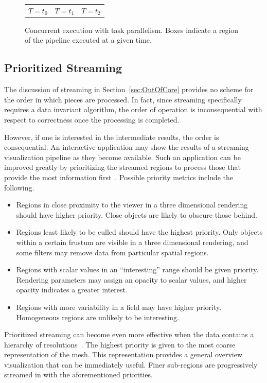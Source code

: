\documentclass[journal,twocolumn,10pt,letterpaper,twoside]{IEEEtran}
\newcommand*{\lcite}[1]{~\cite{#1}}
\newenvironment{packeditemize}{
  \begin{itemize}
    \setlength{\topsep}{0pt}
    \setlength{\itemsep}{0pt}
    \setlength{\parskip}{0pt}
    \setlength{\parsep}{0pt}
    \setlength{\partopsep}{0pt}
}{
  \end{itemize}
}
\begin{document}
\begin{figure}[htbp]
\begin{tabular}{@{}c@{\qquad}c@{\qquad}c@{}}
    $T = t_0$ & $T = t_1$ & $T = t_2$
  \end{tabular}
  \caption{Concurrent execution with task parallelism.  Boxes indicate a
    region of the pipeline executed at a given time.}
  \label{fig:TaskParallelism}
\end{figure}

\subsection{Prioritized Streaming}
\label{sec:PrioritizedStreaming}

The discussion of streaming in Section~\ref{sec:OutOfCore} provides no
scheme for the order in which pieces are processed.  In fact, since
streaming specifically requires a data invariant algorithm, the order of
operation is inconsequential with respect to correctness once the
processing is completed.

However, if one is interested in the intermediate results, the order is
consequential.  An interactive application may show the results of a
streaming visualization pipeline as they become available.  Such an
application can be improved greatly by prioritizing the streamed regions to
process those that provide the most information first\lcite{Ahrens2007}.
Possible priority metrics include the following.
\begin{packeditemize}
\item Regions in close proximity to the viewer in a three dimensional
  rendering should have higher priority.  Close objects are likely to
  obscure those behind.
\item Regions least likely to be culled should have the highest priority.
  Only objects within a certain frustum are visible in a three dimensional
  rendering, and some filters may remove data from particular spatial
  regions.
\item Regions with scalar values in an ``interesting'' range should be
  given priority.  Rendering parameters may assign an opacity to scalar
  values, and higher opacity indicates a greater interest.
\item Regions with more variability in a field may have higher priority.
  Homogeneous regions are unlikely to be interesting.
\end{packeditemize}

Prioritized streaming can become even more effective when the data contains
a hierarchy of resolutions\lcite{Ahrens2009}.  The highest priority is
given to the most coarse representation of the mesh.  This representation
provides a general overview visualization that can be immediately useful.
Finer sub-regions are progressively streamed in with the aforementioned
priorities.
\end{document}
